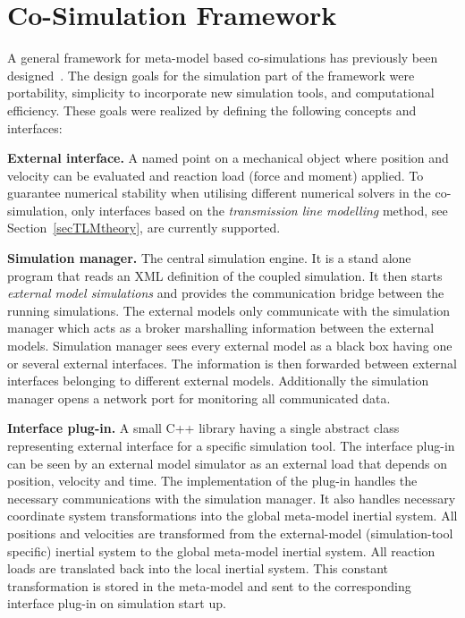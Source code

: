 \chapter{Co-Simulation Framework}
A general framework for meta-model based co-simulations has previously
been designed~\cite{Siemers+Nakhimovski+Fritzson-05}. The design goals
for the simulation part of the framework were portability, simplicity
to incorporate new simulation tools, and computational efficiency.
These goals were realized by defining the following concepts and
interfaces:

\textbf{External interface.} A named point on a mechanical object
where position and velocity can be evaluated and reaction load (force
and moment) applied. To guarantee numerical stability when utilising
different numerical solvers in the co-simulation, only interfaces based
on the {\em transmission line modelling} method, see Section~\ref{secTLMtheory}, are
currently supported.

\textbf{Simulation manager.} The central simulation engine. It is a stand alone
program that reads an XML definition of the coupled simulation.  It
then starts \emph{external model simulations} and provides the
communication bridge between the running simulations. The external
models only communicate with the simulation manager which acts as a
broker marshalling information between the external models. Simulation
manager sees every external model as a black box having one or several
external interfaces. The information is then forwarded between
external interfaces belonging to different external
models. Additionally the simulation manager opens a network port for
monitoring all communicated data.

\textbf{Interface plug-in.} A small C++ library having a single
abstract class representing external interface for a specific
simulation tool. The interface plug-in can be seen by an external
model simulator as an external load that depends on position, velocity
and time. The implementation of the plug-in handles the necessary
communications with the simulation manager. It also handles necessary
coordinate system transformations into the global meta-model inertial
system. All positions and velocities are transformed from the
external-model (simulation-tool specific) inertial system to the
global meta-model inertial system. All reaction loads are translated
back into the local inertial system. This constant transformation is
stored in the meta-model and sent to the corresponding interface
plug-in on simulation start up.

